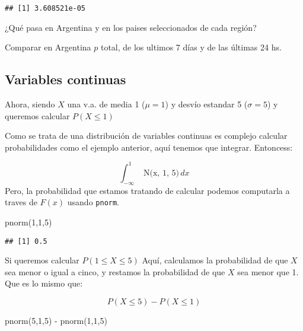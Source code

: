 \documentclass[
]{article}
\newenvironment{Shaded}{\begin{snugshade}}{\end{snugshade}}
\newcommand{\DecValTok}[1]{\textcolor[rgb]{0.00,0.00,0.81}{#1}}
\newcommand{\FunctionTok}[1]{\textcolor[rgb]{0.00,0.00,0.00}{#1}}
\newcommand{\NormalTok}[1]{#1}
\newcommand{\SpecialCharTok}[1]{\textcolor[rgb]{0.00,0.00,0.00}{#1}}
\begin{document}
\begin{verbatim}
## [1] 3.608521e-05
\end{verbatim}

¿Qué pasa en Argentina y en los paises seleccionados de cada región?

Comparar en Argentina \(p\) total, de los ultimos 7 días y de las
últimas 24 hs.

\hypertarget{variables-continuas}{%
\subsection{Variables continuas}\label{variables-continuas}}

Ahora, siendo \(X\) una v.a. de media 1 (\(\mu=1\)) y desvío estandar 5
(\(\sigma = 5\)) y queremos calcular \(P(X\leqslant 1)\)

Como se trata de una distribución de variables continuas es complejo
calcular probabilidades como el ejemplo anterior, aquí tenemos que
integrar. Entoncess:

\[\int_{-\infty}^1 {\text { N(x, 1, 5)}} \, dx\] Pero, la probabilidad
que estamos tratando de calcular podemos computarla a traves de \(F(x)\)
usando \texttt{pnorm}.

\begin{Shaded}
\begin{Highlighting}[]
\FunctionTok{pnorm}\NormalTok{(}\DecValTok{1}\NormalTok{,}\DecValTok{1}\NormalTok{,}\DecValTok{5}\NormalTok{)}
\end{Highlighting}
\end{Shaded}

\begin{verbatim}
## [1] 0.5
\end{verbatim}

Si queremos calcular \(P(1 \le X \le 5)\) Aquí, calculamos la
probabilidad de que \(X\) sea menor o igual a cinco, y restamos la
probabilidad de que \(X\) sea menor que 1. Que es lo mismo que:

\[P(X \le 5) - P(X \le 1) \]

\begin{Shaded}
\begin{Highlighting}[]
\FunctionTok{pnorm}\NormalTok{(}\DecValTok{5}\NormalTok{,}\DecValTok{1}\NormalTok{,}\DecValTok{5}\NormalTok{) }\SpecialCharTok{{-}} \FunctionTok{pnorm}\NormalTok{(}\DecValTok{1}\NormalTok{,}\DecValTok{1}\NormalTok{,}\DecValTok{5}\NormalTok{)}
\end{Highlighting}
\end{Shaded}
\end{document}
